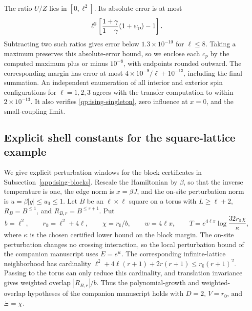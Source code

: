 \documentclass[11pt,a4paper]{article}
\theoremstyle{remark}
\begin{document}
The ratio $U/Z$ lies in $[0,\ell^2]$. Its absolute error is at most
\[
 \ell^2\left[\frac{1+\gamma}{1-\gamma}
                       (1+\epsilon_{\rm fp})-1\right].
\]
Subtracting two such ratios gives error below $1.3\times10^{-10}$
for $\ell\le8$. Taking a maximum preserves this absolute-error
bound, so we enclose each $c_p$ by the computed maximum plus or
minus $10^{-9}$, with endpoints rounded outward. The corresponding
margin has error at most $4\times10^{-9}/\ell+10^{-13}$, including
the final summation. An independent enumeration of all interior
and exterior spin configurations for $\ell=1,2,3$ agrees with the
transfer computation to within $2\times10^{-13}$. It also verifies
\eqref{qp:ising-singleton}, zero influence at $x=0$, and the
small-coupling limit.

\subsection{Explicit shell constants for the square-lattice example}
\label{app:ising-shell-constants}

We give explicit perturbation windows for the block certificates in
Subsection~\ref{app:ising-blocks}. Rescale the Hamiltonian by $\beta$, so that
the inverse temperature is one, the edge norm is $x=\beta J$, and the
on-site perturbation norm is $u=\beta|g|\le u_0\le1$.
Let $B$ be an $\ell\times\ell$ square on a torus with $L\ge\ell+2$,
$R_B=B^{\le1}$, and $R_{B,r}=B^{\le r+1}$. Put
\begin{equation}
 b=\ell^2,\qquad r_0=\ell^2+4\ell,\qquad
 \chi=r_0/b,\qquad w=4\ell x,\qquad
 T=e^{4\ell x}\log\frac{32r_0\chi}{\kappa},
 \label{qp:ising-parameters}
\end{equation}
where $\kappa$ is the chosen certified lower bound on the block margin.
The on-site perturbation changes no crossing interaction, so
the local perturbation bound of the companion manuscript uses $E=e^w$.
The corresponding infinite-lattice neighborhood has cardinality
$\ell^2+4\ell(r+1)+2r(r+1)\le r_0(r+1)^2$.
Passing to the torus can only reduce this cardinality, and translation
invariance gives weighted overlap $|R_{B,r}|/b$. Thus
the polynomial-growth and weighted-overlap hypotheses of the companion manuscript holds with $D=2$, $V=r_0$, and $\Xi=\chi$.
\end{document}
